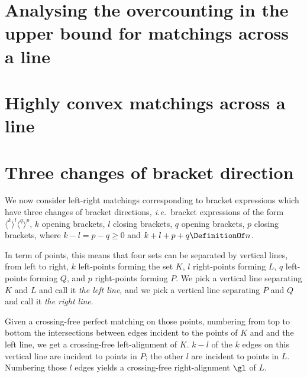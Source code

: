 \documentclass[10pt, a4paper, twoside]{basestyle}
\newcommand{\idest}{\emph{, i.e.\ }}
\begin{document}
\section{Analysing the overcounting in the upper bound for matchings across a line}
\section{Highly convex matchings across a line}
\section{Three changes of bracket direction}
We now consider left-right matchings corresponding to bracket expressions which have three
changes of bracket directions\idest bracket expressions of the form
$\langle^k\rangle^l\langle^q\rangle^p$,
$k$ opening brackets, $l$ closing brackets, $q$ opening brackets, $p$ closing brackets, where
$k-l=p-q\geq 0$ and $k+l+p+q\DefinitionOf n$.

In term of points, this means that four sets can be separated by vertical lines, from left
to right, $k$ left-points forming the set $K$, $l$ right-points forming $L$, $q$ left-points
forming $Q$, and $p$ right-points forming $P$.
We pick a vertical line separating $K$ and $L$ and call it \emph{the left line}, and we pick
a vertical line separating $P$ and $Q$ and call it \emph{the right line}.

Given a crossing-free perfect matching on those points, numbering from top to bottom the
intersections between edges incident to the points of $K$ and and the left line,
we get a crossing-free left-alignment of $K$. $k-l$ of the $k$ edges on this vertical
line are incident to points in $P$; the other $l$ are incident to points in $L$.
Numbering those $l$ edges yields a crossing-free right-alignment $\gl$ of $L$.
\end{document}

